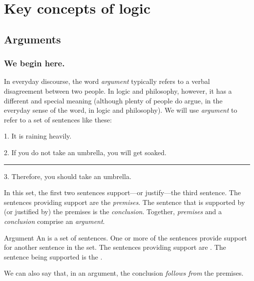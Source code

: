 \part{Key concepts of logic}
\label{ch.intro}


\chapter{Arguments}
\label{s:Arguments}

\section{We begin here.}

In everyday discourse, the word \textit{argument} typically refers to a verbal disagreement between two people. In logic and philosophy, however, it has a different and special meaning (although plenty of people do argue, in the everyday sense of the word, in logic and philosophy). We will use \textit{argument} to refer to a set of sentences like these:
	\begin{earg}\label{argRaining}
		\item[1.] It is raining heavily.
		\item[2.] If you do not take an umbrella, you will get soaked.
		      \vspace{0.1cm}
     			\hrule
      			\vspace{0.12cm}
		\item[3.] Therefore, you should take an umbrella.
	\end{earg}
In this set, the first two sentences support---or justify---the third sentence. The sentences providing support are the \emph{premises}. The sentence that is supported by (or justified by) the premises is the \emph{conclusion}. Together, \textit{premises} and a \textit{conclusion} comprise an \textit{argument}.  

\begin{factboxy}{Argument}
An  is a set of sentences. One or more of the sentences provide support for another sentence in the set. The sentences providing support are . The sentence being supported is the .
\smallskip

We can also say that, in an argument, the conclusion \textit{follows from} the premises.
\end{factboxy}

